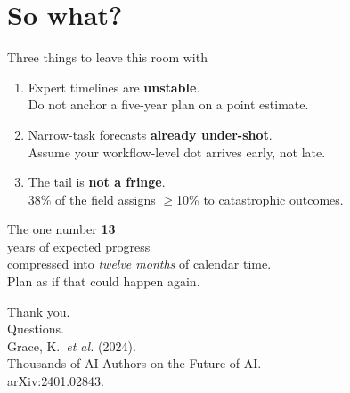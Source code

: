 \documentclass[aspectratio=169, 12pt, xcolor={dvipsnames,table}]{beamer}
\newcommand{\bignum}[1]{{\fontsize{60}{66}\selectfont\bfseries\color{accent}#1}}
\begin{document}
\section{So what?}

\begin{frame}{Three things to leave this room with}
  \vfill
  \begin{enumerate}\setlength\itemsep{1em}
    \item Expert timelines are \textbf{unstable}.\\
          {\small Do not anchor a five-year plan on a point estimate.}
    \item Narrow-task forecasts \textbf{already under-shot}.\\
          {\small Assume your workflow-level dot arrives early, not late.}
    \item The tail is \textbf{not a fringe}.\\
          {\small 38\% of the field assigns $\ge$10\% to catastrophic outcomes.}
  \end{enumerate}
  \vfill
\end{frame}

\begin{frame}{The one number}
  \vfill
  \centering
  \bignum{13}\\[0.4em]
  {\large years of expected progress}\\[0.3em]
  {\large compressed into \emph{twelve months} of calendar time.}\\[2em]
  {\color{mute}Plan as if that could happen again.}
  \vfill
\end{frame}

\begin{frame}[plain]
  \vfill
  \centering
  {\Huge Thank you.}\\[1em]
  {\large Questions.}\\[2em]
  {\small\color{mute}Grace, K.~\emph{et al.} (2024). \\
    Thousands of AI Authors on the Future of AI. \\
    arXiv:2401.02843.}
  \vfill
\end{frame}

\appendix
\end{document}
